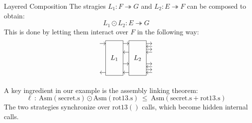 \documentclass[aspectratio=1610,mathserif]{beamer}
\newcommand{\kw}[1]{\ensuremath{ \mathrm{#1} }}
\begin{document}

\begin{frame}{Layered Composition} %
  The stragies $L_1 : F \twoheadrightarrow G$ and
  $L_2 : E \twoheadrightarrow F$ can be composed to obtain:
  \[
     L_1 \odot L_2 : E \twoheadrightarrow G
  \]
  \pause
  This is done by letting them interact over $F$
  in the following way:
  \[
    \begin{tikzpicture}[yscale=0.15,xscale=0.30]
      \draw (1,-1) rectangle (4,11) node[midway] {$L_1$};
      \draw (5,-1) rectangle (8,11) node[midway] {$L_2$};
      \draw[->] (0,10) -- (1,10);
        \draw[->] (4,10) -- (5,10);
          \draw[->] (8,10) -- (9,10);
          \draw[->] (9,9) -- (8,9);
          \draw[->] (8,8) -- (9,8);
          \draw[->] (9,7) -- (8,7);
        \draw[->] (5,7) -- (4,7);
        \draw[->] (4,3) -- (5,3);
          \draw[->] (8,3) -- (9,3);
          \draw[->] (9,2) -- (8,2);
          \draw[->] (8,1) -- (9,1);
          \draw[->] (9,0) -- (8,0);
        \draw[->] (5,0) -- (4,0);
      \draw[->] (1,0) -- (0,0);
    \end{tikzpicture}
  \]

  \pause
  \begin{example}[Assembly linking]
    A key ingredient in our example is
    the assembly linking theorem:
    \[ \ell \::\:
       \kw{Asm}(\kw{secret.s}) \odot \kw{Asm}(\kw{rot13.s}) \:\le\:
       \kw{Asm}(\kw{secret.s} + \kw{rot13.s}) \]
    The two strategies synchronize over $\kw{rot13()}$ calls,
    which become hidden internal calls.
  \end{example}
\end{frame}
\end{document}
